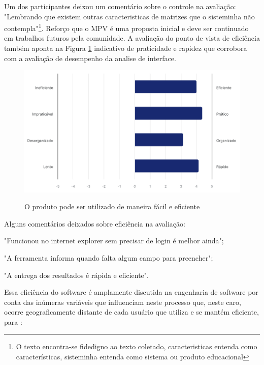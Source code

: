 Um dos participantes deixou um comentário sobre o controle na avaliação:
"Lembrando que existem outras caracteristicas de matrizes que o sisteminha não contempla"\footnote{O texto encontra-se fidedigno ao texto coletado, caracteristicas entenda como características, sisteminha entenda como sistema ou produto educacional}. Reforço que o MPV é uma proposta inicial e deve ser continuado em trabalhos futuros pela comunidade. A avaliação do ponto de vista de eficiência também aponta na Figura \ref{fig:ux-5} indicativo de praticidade e rapidez que corrobora com a avaliação de desempenho da analise de interface.

\begin{figure}[h!]
    \caption{O produto pode ser utilizado de maneira fácil e eficiente}
    \centering
    \includegraphics[scale=0.4]{figuras/resultados/ux-5.png}
    \label{fig:ux-5}
\end{figure}

Alguns comentários deixados sobre eficiência na avaliação:
\begin{citacao}

\item "Funcionou no internet explorer sem precisar de login é melhor ainda";
\item "A ferramenta informa quando falta algum campo para preencher";
\item "A entrega dos resultados é rápida e eficiente".

\end{citacao}

Essa eficiência do software é amplamente discutida na engenharia de software por conta das inúmeras variáveis que influenciam neste processo que, neste caro, ocorre geograficamente distante de cada usuário que utiliza e se mantém eficiente, para :

